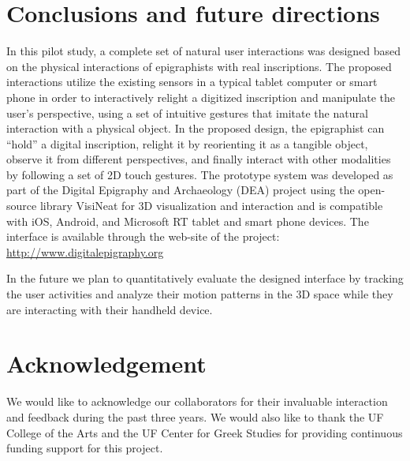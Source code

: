 \documentclass[amsthm,ebook]{saparticle}
\begin{document}
\section{Conclusions and future directions}


\noindent In this pilot study, a complete set of natural user interactions was designed based on the physical interactions of
epigraphists with real inscriptions. The proposed interactions utilize the existing sensors in a typical tablet
computer or smart phone in order to interactively relight a digitized inscription and manipulate the user's
perspective, using a set of intuitive gestures that imitate the natural interaction with a physical object. In the
proposed design, the epigraphist can ``hold'' a digital inscription, relight it by
reorienting it as a tangible object, observe it from different perspectives, and finally interact with other modalities
by following a set of 2D touch gestures. The prototype system was developed as part of the Digital Epigraphy and
Archaeology (DEA) project using the open-source library VisiNeat for 3D visualization and interaction and is compatible
with iOS, Android, and Microsoft RT tablet and smart phone devices. The interface is available through the web-site of
the project: \url{http://www.digitalepigraphy.org}

In the future we plan to quantitatively evaluate the designed interface by tracking the user activities and analyze
their motion patterns in the 3D space while they are interacting with their handheld device. 
\nocite{osman_exploratory_2011}



\section*{Acknowledgement}

\noindent We would like to acknowledge our collaborators for their invaluable interaction and feedback during the past three
years. We would also like to thank the UF College of the Arts and the UF Center for Greek Studies for providing
continuous funding support for this project. 



\end{document}
